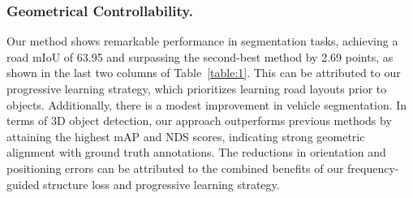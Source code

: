 \subsubsection{Geometrical Controllability.}
Our method shows remarkable performance in segmentation tasks, achieving a road mIoU of 63.95 and surpassing the second-best method by 2.69 points, as shown in the last two columns of Table~\ref{table:1}. This can be attributed to our progressive learning strategy, which prioritizes learning road layouts prior to objects. Additionally, there is a modest improvement in vehicle segmentation.
In terms of 3D object detection, our approach outperforms previous methods by attaining the highest mAP and NDS scores, indicating strong geometric alignment with ground truth annotations. The reductions in orientation and positioning errors can be attributed to the combined benefits of our frequency-guided structure loss and progressive learning strategy.
